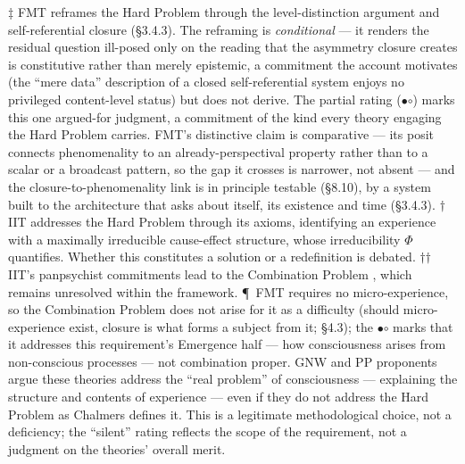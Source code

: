 \documentclass[12pt]{article}
\newcommand{\revstart}{}
\newcommand{\revend}{}
\begin{document}
{\revstart $\ddagger$ FMT reframes the Hard Problem through the level-distinction argument and self-referential closure (\S3.4.3). The reframing is \emph{conditional} --- it renders the residual question ill-posed only on the reading that the asymmetry closure creates is constitutive rather than merely epistemic, a commitment the account motivates (the ``mere data'' description of a closed self-referential system enjoys no privileged content-level status) but does not derive. The partial rating ({\large$\bullet$\hspace{-8.5pt}$\circ$}) marks this one argued-for judgment, a commitment of the kind every theory engaging the Hard Problem carries. FMT's distinctive claim is comparative --- its posit connects phenomenality to an already-perspectival property rather than to a scalar or a broadcast pattern, so the gap it crosses is narrower, not absent --- and the closure-to-phenomenality link is in principle testable (\S8.10), by a system built to the architecture that asks about itself, its existence and time (\S3.4.3).\revend}
$\dagger$ IIT addresses the Hard Problem through its axioms, identifying an experience with a maximally irreducible cause-effect structure, whose irreducibility $\Phi$ quantifies. Whether this constitutes a solution or a redefinition is debated.
$\dagger$$\dagger$ IIT's panpsychist commitments lead to the Combination Problem \citep{Chalmers2016}, which remains unresolved within the framework.
\P\ FMT requires no micro-experience, so the Combination Problem does not arise for it as a difficulty (should micro-experience exist, closure is what forms a subject from it; \S4.3); the {\large$\bullet$\hspace{-8.5pt}$\circ$} marks that it addresses this requirement's Emergence half --- how consciousness arises from non-conscious processes --- not combination proper.
\* GNW and PP proponents argue these theories address the ``real problem'' of consciousness \citep{Seth2021} --- explaining the structure and contents of experience --- even if they do not address the Hard Problem as Chalmers defines it. This is a legitimate methodological choice, not a deficiency; the ``silent'' rating reflects the scope of the requirement, not a judgment on the theories' overall merit.
\end{document}

